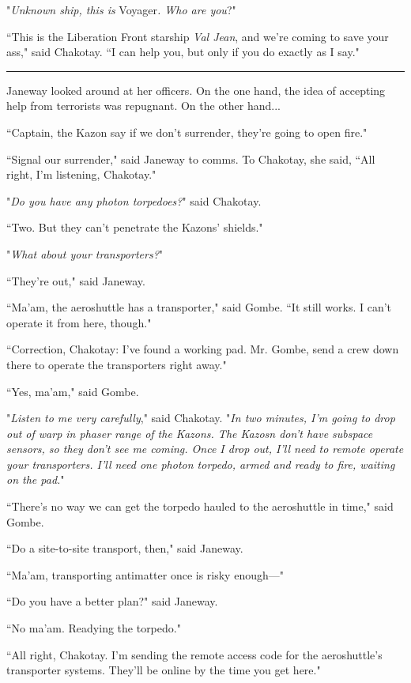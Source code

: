 \documentclass[twoside,letterpaper,12pt]{memoir}
\begin{document}
"\textit{Unknown ship, this is }Voyager\textit{. Who are you}?"

``This is the Liberation Front starship \textit{Val Jean}, and we're coming to save your ass," said Chakotay. ``I can help you, but only if you do exactly as I say."

\begin{center}\rule{3cm}{0.4 pt}\end{center}

Janeway looked around at her officers. On the one hand, the idea of accepting help from terrorists was repugnant. On the other hand...

``Captain, the Kazon say if we don't surrender, they're going to open fire."

``Signal our surrender," said Janeway to comms. To Chakotay, she said, ``All right, I'm listening, Chakotay."

"\textit{Do you have any photon torpedoes?}" said Chakotay.

``Two. But they can't penetrate the Kazons' shields."

"\textit{What about your transporters?}"

``They're out," said Janeway.

``Ma'am, the aeroshuttle has a transporter," said Gombe. ``It still works. I can't operate it from here, though."

``Correction, Chakotay: I've found a working pad. Mr. Gombe, send a crew down there to operate the transporters right away."

``Yes, ma'am," said Gombe.

"\textit{Listen to me very carefully}," said Chakotay. "\textit{In two minutes, I'm going to drop out of warp in phaser range of the Kazons. The Kazosn don't have subspace sensors, so they don't see me coming. Once I drop out, I'll need to remote operate your transporters. I’ll need one photon torpedo, armed and ready to fire, waiting on the pad.}"

``There's no way we can get the torpedo hauled to the aeroshuttle in time," said Gombe.

``Do a site-to-site transport, then," said Janeway.

``Ma'am, transporting antimatter once is risky enough---"

``Do you have a better plan?" said Janeway.

``No ma'am. Readying the torpedo."

``All right, Chakotay. I'm sending the remote access code for the aeroshuttle's transporter systems. They'll be online by the time you get here."
\end{document}
